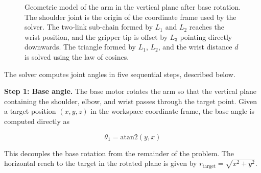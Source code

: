 \begin{figure}[H]
    \caption{Geometric model of the arm in the vertical plane after 
    base rotation. The shoulder joint is the origin of the 
    coordinate frame used by the solver. The two-link sub-chain 
    formed by $L_1$ and $L_2$ reaches the wrist position, and the 
    gripper tip is offset by $L_3$ pointing directly downwards. 
    The triangle formed by $L_1$, $L_2$, and the wrist distance 
    $d$ is solved using the law of cosines.}
\end{figure}

The solver computes joint angles in five sequential steps, 
described below.

\textbf{Step 1: Base angle.} The base motor rotates the arm so 
that the vertical plane containing the shoulder, elbow, and 
wrist passes through the target point. Given a target position 
$(x, y, z)$ in the workspace coordinate frame, the base angle 
is computed directly as

\begin{equation}
    \theta_1 = \mathrm{atan2}(y, x)
\end{equation}

This decouples the base rotation from the remainder of the 
problem. The horizontal reach to the target in the rotated 
plane is given by 
$r_{\mathrm{target}} = \sqrt{x^2 + y^2}$.

